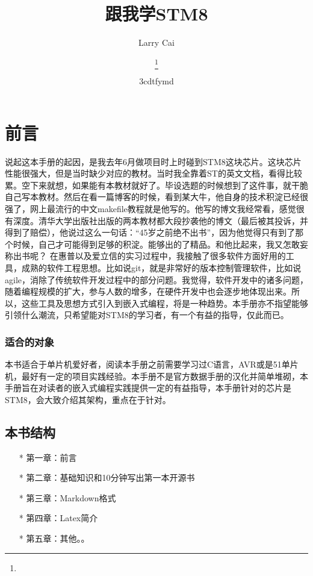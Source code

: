 \documentclass[a4paper]{book}
\title{{跟我学STM8}}
\author{Larry Cai}
\title{\huge{\savedtitle}}
\author{\textbf{\savedauthor}\thanks{}}
\date{\w3cdtfymd}
\begin{document}
\thispagestyle{empty}
\setcounter{tocdepth}{4}

\frontmatter
\chapter*{前言}

说起这本手册的起因，是我去年6月做项目时上时碰到STM8这块芯片。这块芯片性能很强大，但是当时缺少对应的教材。当时我全靠着ST的英文文档，看得比较累。空下来就想，如果能有本教材就好了。毕设选题的时候想到了这件事，就干脆自己写本教材。然后在看一篇博客的时候，看到某大牛，他自身的技术积淀已经很强了，网上最流行的中文makefile教程就是他写的。他写的博文我经常看，感觉很有深度。清华大学出版社出版的两本教材都大段抄袭他的博文（最后被其投诉，并得到了赔偿），他说过这么一句话：“45岁之前绝不出书”，因为他觉得只有到了那个时候，自己才可能得到足够的积淀。能够出的了精品。和他比起来，我又怎敢妄称出书呢？ 在惠普以及爱立信的实习过程中，我接触了很多软件方面好用的工具，成熟的软件工程思想。比如说git，就是非常好的版本控制管理软件，比如说agile，消除了传统软件开发过程中的部分问题。我觉得，软件开发中的诸多问题，随着编程规模的扩大，参与人数的增多，在硬件开发中也会逐步地体现出来。所以，这些工具及思想方式引入到嵌入式编程，将是一种趋势。本手册亦不指望能够引领什么潮流，只希望能对STM8的学习者，有一个有益的指导，仅此而已。

\subsection*{适合的对象}

本书适合于单片机爱好者，阅读本手册之前需要学习过C语言，AVR或是51单片机，最好有一定的项目实践经验。本手册不是官方数据手册的汉化并简单堆砌，本手册旨在对读者的嵌入式编程实践提供一定的有益指导，本手册针对的芯片是STM8，会大致介绍其架构，重点在于针对。

\section*{本书结构}

\begin{itemize}\setlength{\itemsep}{1pt}\setlength{\parskip}{0pt}\setlength{\parsep}{0pt}
\item[*]
  第一章：前言
\item[*]
  第二章：基础知识和10分钟写出第一本开源书
\item[*]
  第三章：Markdown格式
\item[*]
  第四章：Latex简介
\item[*]
  第五章：其他。。
\end{itemize}
\end{document}
